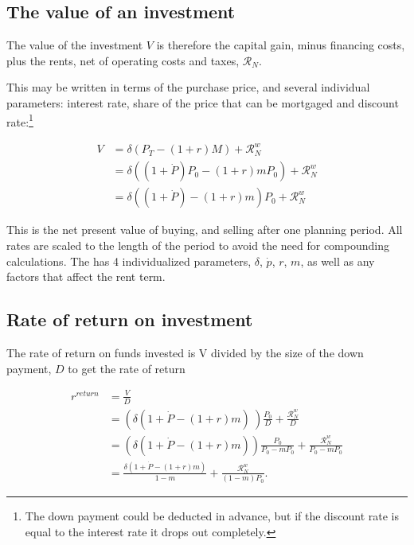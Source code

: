  \subsection{The value of an investment}
The value of the investment $V$ is therefore the capital gain, minus financing costs, plus the rents, net of operating costs and taxes, $\mathcal{R}_N$.
 
 This may be written in terms of the purchase price, and several individual parameters: interest  rate, share of the price that can be mortgaged and  discount rate:\footnote{The down payment could be deducted in advance, but if the discount rate is equal to the interest rate it drops out completely.}
 
\begin{align}
V &= \delta \left(P_T - (1+r)M\right) +   \mathcal{R}^w_N   \\
&= \delta \left((1+\dot P) P_0 - (1+r)mP_0\right)  +      \mathcal{R}^w_N \\
  &= \delta \left((1+\dot P)    - (1+r)m    \right) P_0 + \mathcal{R}^w_N 
\end{align}

This is the net present value of buying, and selling after one planning period. All rates are scaled to the length of the period to avoid the need for compounding calculations. The has 4 individualized  parameters, $\delta$, $\dot p$, $r$, $m$, as well as any factors that affect the rent term.



\subsection{Rate of return on investment}
The rate of return on funds invested is V divided by the size of the down payment, $D$ to get the rate of return  

\begin{align}
r^{return} 
  &= \frac{V}{D}  \nonumber \\
  &= \left(\delta \left(1+\dot P - (1+r)m\right) \ \right) \frac{P_0}{D}  + \frac{\mathcal{R}^w_N }{D}      \nonumber \\
  &= \left(\delta \left(1+\dot P - (1+r)m\right)  \right) \frac{P_0}{P_0-mP_0} +  \frac{\mathcal{R}^w_N }{P_0-mP_0}  \\ 
  &= \frac{\delta \left(1+\dot P - (1+r)m\right) }{1-m} +\frac{\mathcal{R}^w_N }{(1-m)P_0}.
\label{eqn-property-investment-return1}
\end{align}

